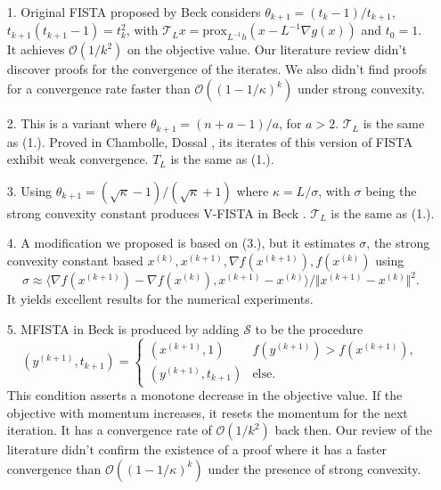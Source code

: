 \documentclass[]{article}
\theoremstyle{definition}
\numberwithin{equation}{subsection}
\begin{document}
        \begin{itemize}
            \item [1.] Original FISTA proposed by Beck \cite{beck_fast_2009-1} considers $\theta_{k + 1} = (t_k - 1)/t_{k + 1}$, $t_{k + 1}(t_{k + 1} - 1) = t_{k}^2$, with $\mathcal T_L x = \text{prox}_{L^{-1}h}(x  - L^{-1}\nabla g(x))$ and $t_0 = 1$. 
            It achieves $\mathcal O(1/k^2)$ on the objective value. 
            Our literature review didn't discover proofs for the convergence of the iterates. We also didn't find proofs for a convergence rate faster than $\mathcal O((1 - 1/\kappa)^k)$ under strong convexity. 
            \item [2.] 
            This is a variant where $\theta_{k + 1} = (n + a - 1)/a$, for $a > 2$. $\mathcal T_L$ is the same as (1.). 
            Proved in Chambolle, Dossal \cite{chambolle_convergence_2015}, its iterates of this version of FISTA exhibit weak convergence. $T_L$ is the same as (1.). 
            \item [3.] Using $\theta_{k + 1} = (\sqrt{\kappa} - 1)/(\sqrt{\kappa} + 1)$ where $\kappa = L/\sigma$, with $\sigma$ being the strong convexity constant produces V-FISTA in Beck \cite[10.7.7]{beck_first-order_nodate}\cite[3.3]{noel_nesterovs_nodate}. $\mathcal T_L$ is the same as (1.). 
            \item [4.] A modification we proposed is based on (3.), but it estimates $\sigma$, the strong convexity constant based $x^{(k)}, x^{(k + 1)}, \nabla f(x^{(k + 1)}), f(x^{(k)})$ using 
            \[
                \sigma \approx \langle \nabla f(x^{(k + 1)}) - \nabla f(x^{(k)}), x^{(k + 1)} - x^{(k)}\rangle/ 
                \Vert x^{(k + 1)} - x^{(k)}\Vert^2. 
            \]
            It yields excellent results for the numerical experiments. 
            \item [5.] MFISTA in Beck\cite{beck_fast_2009} is produced by adding $\mathcal S$ to be the procedure
            \[
                (y^{(k + 1)}, t_{k + 1}) = \begin{cases}
                    (x^{(k + 1)}, 1) & f(y^{(k + 1)}) > f(x^{(k + 1)}),
                    \\
                    (y^{(k + 1)}, t_{k + 1}) & \text{else}. 
                \end{cases}
            \]
            This condition asserts a monotone decrease in the objective value. If the objective with momentum increases, it resets the momentum for the next iteration.  It has a convergence rate of $\mathcal O(1/k^2)$ back then. Our review of the literature didn't confirm the existence of a proof where it has a faster convergence than $\mathcal O((1 - 1/\kappa)^k)$ under the presence of strong convexity. 
        \end{itemize}
\end{document}
